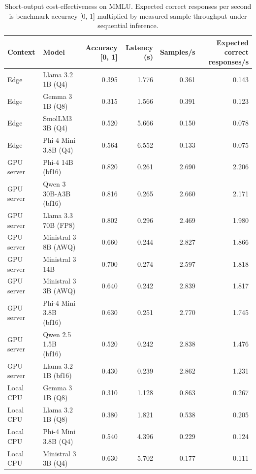 \begin{table}[t]
\centering
\caption{Short-output cost-effectiveness on MMLU. Expected correct responses per second is benchmark accuracy [0, 1] multiplied by measured sample throughput under sequential inference.}
\label{tab:cost-effectiveness}
\scriptsize
\setlength{\tabcolsep}{3.2pt}
\renewcommand{\arraystretch}{1.08}
\begin{tabularx}{\textwidth}{@{}lLrrrr@{}}
\toprule
\textbf{Context} & \textbf{Model} & \textbf{Accuracy [0, 1]} & \textbf{Latency (s)} & \textbf{Samples/s} & \textbf{Expected correct responses/s} \\
\midrule
Edge & Llama 3.2 1B (Q4) & 0.395 & 1.776 & 0.361 & 0.143 \\
Edge & Gemma 3 1B (Q8) & 0.315 & 1.566 & 0.391 & 0.123 \\
Edge & SmolLM3 3B (Q4) & 0.520 & 5.666 & 0.150 & 0.078 \\
Edge & Phi-4 Mini 3.8B (Q4) & 0.564 & 6.552 & 0.133 & 0.075 \\
GPU server & Phi-4 14B (bf16) & 0.820 & 0.261 & 2.690 & 2.206 \\
GPU server & Qwen 3 30B-A3B (bf16) & 0.816 & 0.265 & 2.660 & 2.171 \\
GPU server & Llama 3.3 70B (FP8) & 0.802 & 0.296 & 2.469 & 1.980 \\
GPU server & Ministral 3 8B (AWQ) & 0.660 & 0.244 & 2.827 & 1.866 \\
GPU server & Ministral 3 14B & 0.700 & 0.274 & 2.597 & 1.818 \\
GPU server & Ministral 3 3B (AWQ) & 0.640 & 0.242 & 2.839 & 1.817 \\
GPU server & Phi-4 Mini 3.8B (bf16) & 0.630 & 0.251 & 2.770 & 1.745 \\
GPU server & Qwen 2.5 1.5B (bf16) & 0.520 & 0.242 & 2.838 & 1.476 \\
GPU server & Llama 3.2 1B (bf16) & 0.430 & 0.239 & 2.862 & 1.231 \\
Local CPU & Gemma 3 1B (Q8) & 0.310 & 1.128 & 0.863 & 0.267 \\
Local CPU & Llama 3.2 1B (Q8) & 0.380 & 1.821 & 0.538 & 0.205 \\
Local CPU & Phi-4 Mini 3.8B (Q4) & 0.540 & 4.396 & 0.229 & 0.124 \\
Local CPU & Ministral 3 3B (Q4) & 0.630 & 5.702 & 0.177 & 0.111 \\
\bottomrule
\end{tabularx}
\end{table}
